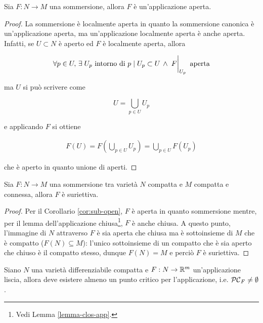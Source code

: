 \begin{corollary}\label{cor:sub-open}
	Sia $ F : N \to M $ una sommersione, allora $ F $ è un'applicazione aperta.
\end{corollary}

\begin{proof}
	La sommersione è localmente aperta in quanto la sommersione canonica è un'applicazione aperta, ma un'applicazione localmente aperta è anche aperta. Infatti, se $ U \subset N $ è aperto ed $ F $ è localmente aperta, allora
	
	\begin{equation}
		\forall p \in U, \, \E U_{p} \text{ intorno di } p \mid U_{p} \subset U \, \wedge \, \eval{F}_{U_{p}} \text{ aperta}
	\end{equation}

	ma $ U $ si può scrivere come
	
	\begin{equation}
		U = \bigcup_{p \in U} U_{p}
	\end{equation}

	e applicando $ F $ si ottiene
	
	\begin{align}
		F(U) = F \left( \bigcup_{p \in U} U_{p} \right) %
		= \bigcup_{p \in U} F(U_{p})
	\end{align}

	che è aperto in quanto unione di aperti.
\end{proof}

\begin{corollary}\label{cor:sub-comp-conn-surj}
	Sia $ F : N \to M $ una sommersione tra varietà $ N $ compatta e $ M $ compatta e connessa, allora $ F $ è suriettiva.
\end{corollary}

\begin{proof}
	Per il Corollario \ref{cor:sub-open}, $ F $ è aperta in quanto sommersione mentre, per il lemma dell'applicazione chiusa\footnote{%
		Vedi Lemma \ref{lemma-clos-app}.%
	}, $ F $ è anche chiusa. A questo punto, l'immagine di $ N $ attraverso $ F $ è sia aperta che chiusa ma è sottoinsieme di $ M $ che è compatto ($ F(N) \subseteq M $): l'unico sottoinsieme di un compatto che è sia aperto che chiuso è il compatto stesso, dunque $ F(N) = M $ e perciò $ F $ è suriettiva.
\end{proof}

\begin{corollary}
	Siano $ N $ una varietà differenziabile compatta e $ F : N \to \mathbb{R}^{m} $ un'applicazione liscia, allora deve esistere almeno un punto critico per l'applicazione, i.e. $ \mathcal{PC}_{F} \neq \emptyset $.
\end{corollary}

